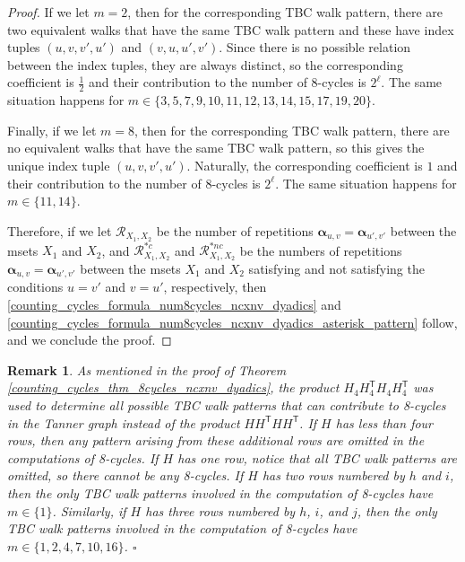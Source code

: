 \documentclass[11pt]{article}
\theoremstyle{plain}
\theoremstyle{plain}
\newtheorem{PreRemark}[lemma]{{\textbf{Remark}}}
\newenvironment{remark}%
    {\begin{PreRemark}\upshape}{\hfill$\square$\end{PreRemark}}
\theoremstyle{definition}
\numberwithin{theo}{section}
\newcommand{\balpha}{{\boldsymbol \alpha}}
\newcounter{alp}
\newcounter{rom}
\begin{document}
\begin{proof}
If we let $m=2$, then for the corresponding TBC walk pattern, there are two equivalent walks that have the same TBC walk pattern and these have index tuples $(u,v,v',u')$ and $(v,u,u',v')$. Since there is no possible relation between the index tuples, they are always distinct, so the corresponding coefficient is $\frac{1}{2}$ and their contribution to the number of 8-cycles is $2^\ell$. The same situation happens for $m\in\{3,5,7,9,10,11,12,13,14,15,17,19,20\}$. 

Finally, if we let $m=8$, then for the corresponding TBC walk pattern, there are no equivalent walks that have the same TBC walk pattern, so this gives the unique index tuple $(u,v,v',u')$. Naturally, the corresponding coefficient is $1$ and their contribution to the number of 8-cycles is $2^\ell$. The same situation happens for $m\in\{11,14\}$.

Therefore, if we let $\mathcal{R}_{X_1,X_2}$ be the number of repetitions $\balpha_{u,v}=\balpha_{u',v'}$ between the msets $X_1$ and $X_2$, and $\mathcal{R}_{X_1,X_2}^{*c}$ and $\mathcal{R}_{X_1,X_2}^{*nc}$ be the numbers of repetitions $\balpha_{u,v}=\balpha_{u',v'}$ between the msets $X_1$ and $X_2$ satisfying and not satisfying the conditions $u=v'$ and $v=u'$, respectively, then \eqref{counting_cycles_formula_num8cycles_ncxnv_dyadics} and \eqref{counting_cycles_formula_num8cycles_ncxnv_dyadics_asterisk_pattern} follow, and we conclude the proof.
\end{proof}

\begin{remark}
As mentioned in the proof of Theorem \ref{counting_cycles_thm_8cycles_ncxnv_dyadics}, the product $H_4H_4^\mathsf{T}H_4H_4^\mathsf{T}$ was used to determine all possible TBC walk patterns that can contribute to 8-cycles in the Tanner graph instead of the product $HH^\mathsf{T}HH^\mathsf{T}$. If $H$ has less than four rows, then any pattern arising from these additional rows are omitted in the computations of 8-cycles. If $H$ has one row, notice that all TBC walk patterns are omitted, so there cannot be any 8-cycles. If $H$ has two rows numbered by $h$ and $i$, then the only TBC walk patterns involved in the computation of 8-cycles have $m\in\{1\}$. Similarly, if $H$ has three rows numbered by $h$, $i$, and $j$, then the only TBC walk patterns involved in the computation of 8-cycles have $m\in\{1,2,4,7,10,16\}$.
\end{remark}
\end{document}
